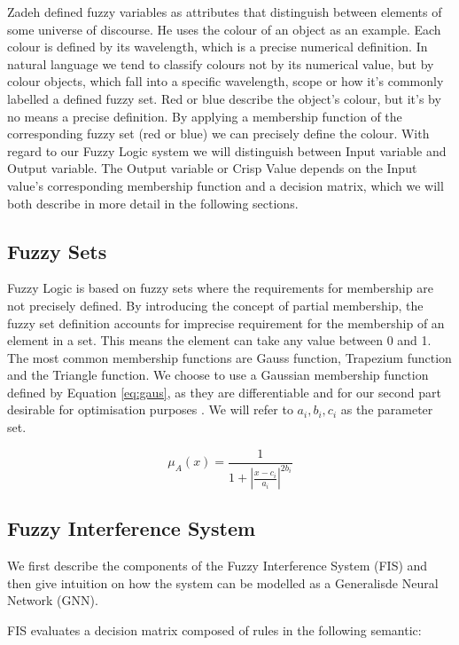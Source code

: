 Zadeh defined fuzzy variables as attributes that distinguish between elements of some universe of discourse. He uses the colour of an object as an example. Each colour is defined by its wavelength, which is a precise numerical definition. In natural language we tend to classify colours not by its numerical value, but by colour objects, which fall into a specific wavelength, scope or how it's commonly labelled a defined fuzzy set. Red or blue describe the object's colour, but it's by no means a precise definition. By applying a membership function of the corresponding fuzzy set (red or blue) we can precisely define the colour. With regard to our Fuzzy Logic system we will distinguish between Input variable and Output variable. The Output variable or Crisp Value depends on the Input value's corresponding membership function and a decision matrix, which we will both describe in more detail in the following sections.


\subsection{Fuzzy Sets}

Fuzzy Logic is based on fuzzy sets where the requirements for membership are not precisely defined. By introducing the concept of partial membership, the fuzzy set definition accounts for imprecise requirement for the membership of an element in a set. This means the element can take any value between 0 and 1. The most common membership functions are Gauss function, Trapezium function and the Triangle function. We choose to use a Gaussian membership function defined by  Equation \ref{eq:gaus},  as they are differentiable and for our second part desirable for optimisation purposes \cite{wu12}. We will refer to $a_i, b_i, c_i$ as the parameter set. 


\begin{equation} \label{eq:gaus}
\mu_A(x) =  \frac{1}{ 1 + |\frac{x- c_i }{a_i}|^{2b_i}  }\end{equation}


\subsection{Fuzzy Interference System}

We first describe the components of the Fuzzy Interference System (FIS) and then give intuition on how the system can be modelled as a Generalisde Neural Network (GNN). 

FIS evaluates a decision matrix composed of rules in the following semantic: \\

